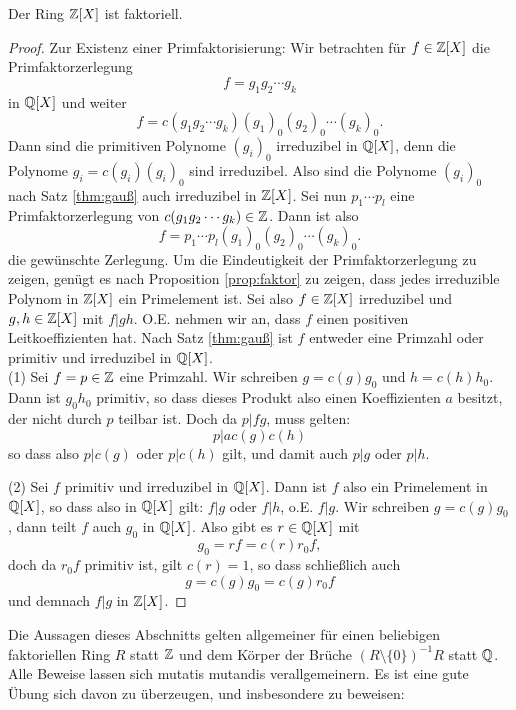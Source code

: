 \documentclass{book}
\begin{document}
\begin{thm}
    \label{thm:zxfaktoriell}
    Der Ring $\mathbb{Z}[X]$ ist faktoriell.
\end{thm}
\begin{proof}
    Zur Existenz einer Primfaktorisierung: Wir betrachten für $f \in \mathbb{Z}[X]$ die Primfaktorzerlegung
    \[
        f  = g_1 g_2 \cdots g_k
    \]
    in $\mathbb{Q}[X]$ und weiter
    \[
        f  = c(g_1 g_2 \cdots g_k) (g_1)_0 (g_2)_0 \cdots (g_k)_0.
    \]
    Dann sind die primitiven Polynome $(g_i)_0$ irreduzibel in $\mathbb{Q}[X]$, denn
    die Polynome $g_i = c(g_i) (g_i)_0$ sind irreduzibel. Also sind die
    Polynome $(g_i)_0$ nach Satz \ref{thm:gauß} auch irreduzibel in $\mathbb{Z}[X]$.
    Sei nun $p_1 \cdots p_l$ eine Primfaktorzerlegung von $c(g_1 g_2 \cdots
    g_k) \in \mathbb{Z}$. Dann ist also 
    \[
        f = p_1 \cdots p_l (g_1)_0 (g_2)_0 \cdots (g_k)_0.
    \]
    die gewünschte Zerlegung. Um die Eindeutigkeit der Primfaktorzerlegung zu
    zeigen, genügt es nach Proposition \ref{prop:faktor} zu zeigen, dass jedes
    irreduzible Polynom in $\mathbb{Z}[X]$ ein Primelement ist. Sei also $f \in
    \mathbb{Z}[X]$ irreduzibel und $g,h \in \mathbb{Z}[X]$ mit $f | gh$. O.E. nehmen wir an,
    dass $f$ einen positiven Leitkoeffizienten hat. Nach Satz \ref{thm:gauß}
    ist $f$ entweder eine Primzahl oder primitiv und irreduzibel in $\mathbb{Q}[X]$.\\

    \noindent
    (1) Sei $f=p \in \mathbb{Z}$ eine Primzahl. Wir schreiben $g = c(g) g_0$ und $h = c(h) h_0$.
    Dann ist $g_0 h_0$ primitiv, so dass dieses Produkt also einen
    Koeffizienten $a$ besitzt, der nicht durch $p$ teilbar ist. Doch da $p | fg$, muss gelten:
    \[
        p | a c(g)c(h)
    \]
    so dass also $p| c(g)$ oder $p | c(h)$ gilt, und damit auch $p | g$ oder $p | h$. 
    
    \noindent
    (2) Sei $f$ primitiv und irreduzibel in $\mathbb{Q}[X]$. Dann ist $f$ also ein
    Primelement in $\mathbb{Q}[X]$, so dass also in $\mathbb{Q}[X]$ gilt: $f | g$ oder $f | h$,
    o.E. $f | g$. Wir schreiben $g = c(g) g_0$, dann teilt $f$ auch $g_0$ in
    $\mathbb{Q}[X]$. Also gibt es $r \in \mathbb{Q}[X]$ mit 
    \[
        g_0 = rf = c(r) r_0 f,
    \]
    doch da $r_0 f$ primitiv ist, gilt $c(r) = 1$, so dass schließlich auch 
    \[
        g = c(g) g_0 = c(g) r_0 f
    \]
    und demnach $f | g$ in $\mathbb{Z}[X]$. 
\end{proof}

Die Aussagen dieses Abschnitts gelten allgemeiner für einen beliebigen
faktoriellen Ring $R$ statt $\mathbb{Z}$ und dem Körper der Brüche $(R \setminus \{0
\})^{-1}R$ statt $\mathbb{Q}$. Alle Beweise lassen sich mutatis mutandis
verallgemeinern. Es ist eine gute Übung sich davon zu überzeugen, und
insbesondere zu beweisen:
\end{document}
